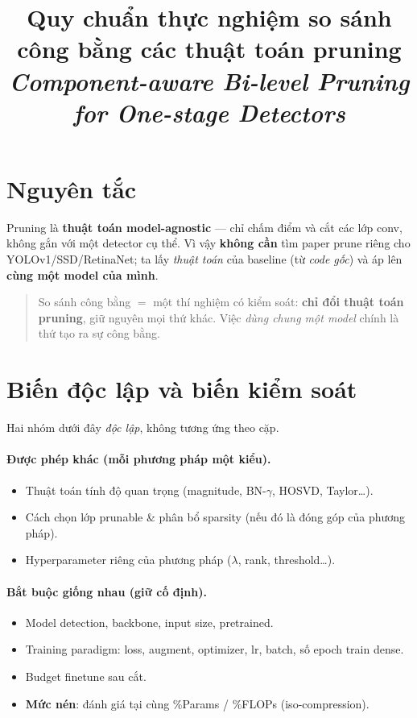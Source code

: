\documentclass[11pt,a4paper]{article}
\title{\textbf{Quy chuẩn thực nghiệm so sánh công bằng các thuật toán pruning}\\
\large \emph{Component-aware Bi-level Pruning for One-stage Detectors}}
\author{}
\date{}
\begin{document}
\maketitle
\vspace{-2em}

\section{Nguyên tắc}
Pruning là \textbf{thuật toán model-agnostic} --- chỉ chấm điểm và cắt các lớp conv, không gắn với một
detector cụ thể. Vì vậy \textbf{không cần} tìm paper prune riêng cho YOLOv1/SSD/RetinaNet; ta lấy
\emph{thuật toán} của baseline (từ \emph{code gốc}) và áp lên \textbf{cùng một model của mình}.

\begin{quote}
So sánh công bằng $=$ một thí nghiệm có kiểm soát: \textbf{chỉ đổi thuật toán pruning}, giữ nguyên
mọi thứ khác. Việc \emph{dùng chung một model} chính là thứ tạo ra sự công bằng.
\end{quote}

\section{Biến độc lập và biến kiểm soát}
Hai nhóm dưới đây \emph{độc lập}, không tương ứng theo cặp.

\paragraph{Được phép khác (mỗi phương pháp một kiểu).}
\begin{itemize}
  \item Thuật toán tính độ quan trọng (magnitude, BN-$\gamma$, HOSVD, Taylor\ldots).
  \item Cách chọn lớp prunable \& phân bổ sparsity (nếu đó là đóng góp của phương pháp).
  \item Hyperparameter riêng của phương pháp ($\lambda$, rank, threshold\ldots).
\end{itemize}

\paragraph{Bắt buộc giống nhau (giữ cố định).}
\begin{itemize}
  \item Model detection, backbone, input size, pretrained.
  \item Training paradigm: loss, augment, optimizer, lr, batch, số epoch train dense.
  \item Budget finetune sau cắt.
  \item \textbf{Mức nén}: đánh giá tại cùng \%Params / \%FLOPs (iso-compression).
\end{itemize}
\end{document}
